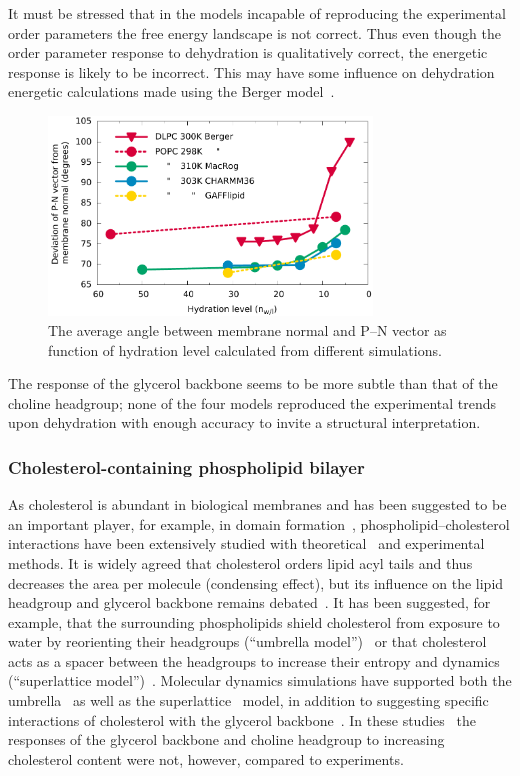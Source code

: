 \documentclass[journal=jpcbfk,manuscript=article]{achemso}
\begin{document}
It must be stressed that in the models
incapable of reproducing the experimental order parameters the free energy landscape is not correct. Thus
even though the order parameter response to dehydration is qualitatively correct,
the energetic response is likely to be incorrect.
This may have some influence on dehydration energetic calculations made using the Berger model~\cite{eun09,schneck12}.
\begin{figure}[]
  \centering
  \includegraphics[width=8.6cm]{../Fig/dehydrationPN.pdf}

  \caption{\label{PNangle}
    The average angle between membrane normal and P--N vector as function of
    hydration level calculated from different simulations.
  }
\end{figure}

The response of the glycerol backbone seems to be more subtle than that of the choline headgroup;
none of the four models reproduced the experimental trends upon dehydration with enough accuracy to invite a
structural interpretation.

\subsubsection{Cholesterol-containing phospholipid bilayer}
As cholesterol is abundant in biological membranes and
has been suggested to be an important player, for example, in domain formation~\cite{simons04,somerharju09},
phospholipid--cholesterol interactions have been extensively studied with theoretical~\cite{huang99,zhu07,rog09,alwarawrah12} and
experimental~\cite{brown78,marsh10,ferreira13,marsh13} methods.
It is widely agreed that cholesterol orders lipid acyl tails and thus decreases the area per molecule (condensing effect),
but its influence on the lipid headgroup and glycerol backbone remains debated~\cite{huang99,simons04,somerharju09}.
It has been suggested, for example, that the surrounding phospholipids shield cholesterol from exposure to water by 
reorienting their headgroups (``umbrella model'')~\cite{huang99} or that cholesterol acts as a spacer between the headgroups to increase 
their entropy and dynamics (``superlattice model'')~\cite{somerharju09}. 
Molecular dynamics simulations have supported both
the umbrella~\cite{alwarawrah12} as well as the superlattice~\cite{zhu07} model,
in addition to suggesting specific interactions of cholesterol with the glycerol backbone~\cite{rog09}.
In these studies~\cite{zhu07,rog09,alwarawrah12}
the responses of the glycerol backbone and choline headgroup 
to increasing cholesterol content were not, however, compared to experiments. 
\end{document}
